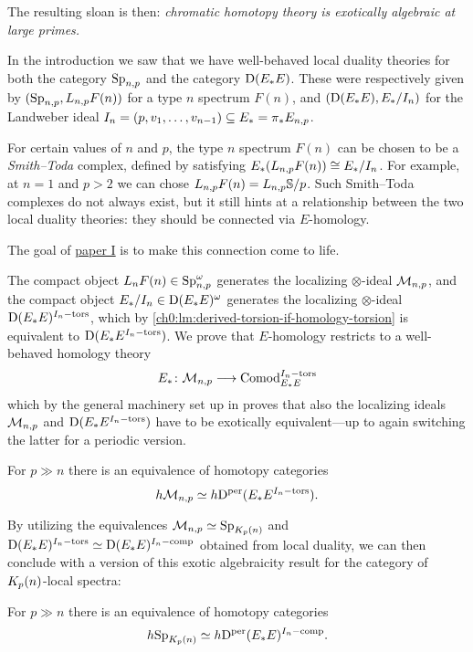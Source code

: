 The resulting sloan is then: \emph{chromatic homotopy theory is exotically algebraic at large primes.} 

In the introduction we saw that we have well-behaved local duality theories for both the category $\mathrm{Sp}_{n,p}$ and the category $\mathrm{D}(E_*E)$. These were respectively given by $(\mathrm{Sp}_{n,p}, L_{n,p} F(n))$ for a type $n$ spectrum $F(n)$, and $(\mathrm{D}(E_*E), E_*/I_n)$ for the Landweber ideal $I_n=(p, v_1, \ldots, v_{n-1})\subseteq E_*= \pi_* E_{n,p}$.

For certain values of $n$ and $p$, the type $n$ spectrum $F(n)$ can be chosen to be a \emph{Smith--Toda} complex, defined by satisfying $E_*(L_{n,p} F(n)) \cong E_*/I_n$. For example, at $n=1$ and $p>2$ we can chose $L_{n,p} F(n) = L_{n,p}\mathbb{S}/p$. Such Smith--Toda complexes do not always exist, but it still hints at a relationship between the two local duality theories: they should be connected via $E$-homology. 

The goal of \hyperref[ch1]{paper I} is to make this connection come to life. 

The compact object $L_n F(n)\in \mathrm{Sp}_{n,p}^\omega$ generates the localizing $\otimes$-ideal $\mathcal{M}_{n,p}$, and the compact object $E_*/I_n \in \mathrm{D}(E_*E)^\omega$ generates the localizing $\otimes$-ideal $\mathrm{D}(E_*E)^{I_n-\mathrm{tors}}$, which by \cref{ch0:lm:derived-torsion-if-homology-torsion} is equivalent to $\mathrm{D}(E_*E^{I_n-\mathrm{tors}})$. We prove that $E$-homology restricts to a well-behaved homology theory 
\[E_*\colon \mathcal{M}_{n,p}\longrightarrow \mathrm{Comod}_{E_*E}^{I_n-\mathrm{tors}}\] 
which by the general machinery set up in \cite{patchkoria-pstragowski_2021} proves that also the localizing ideals $\mathcal{M}_{n,p}$ and $\mathrm{D}(E_*E^{I_n-\mathrm{tors}})$ have to be exotically equivalent---up to again switching the latter for a periodic version. 

\begin{theorem}
    \label{ch0:summary1:thm:B}
    For $p\gg n$ there is an equivalence of homotopy categories
    \[h \mathcal{M}_{n,p} \simeq h \mathrm{D}^{\mathrm{per}}(E_*E^{I_n-\mathrm{tors}}).\]
\end{theorem}

By utilizing the equivalences $\mathcal{M}_{n,p} \simeq \mathrm{Sp}_{K_p(n)}$ and $\mathrm{D}(E_*E)^{I_n-\mathrm{tors}} \simeq \mathrm{D}(E_*E)^{I_n-\mathrm{comp}}$ obtained from local duality, we can then conclude with a version of this exotic algebraicity result for the category of ${K_p(n)}$-local spectra: 

\begin{theorem}
    \label{ch0:summary1:thm:A}
    For $p \gg n$ there is an equivalence of homotopy categories
    \[h \mathrm{Sp}_{K_p(n)} \simeq h \mathrm{D}^{\mathrm{per}}(E_*E)^{I_n-\mathrm{comp}}.\]
\end{theorem}

